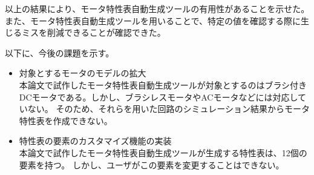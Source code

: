 以上の結果により、モータ特性表自動生成ツールの有用性があることを示せた。また、モータ特性表自動生成ツールを用いることで、特定の値を確認する際に生じるミスを削減できることが確認できた。

以下に、今後の課題を示す。

\begin{itemize}
    \item 対象とするモータのモデルの拡大\\
    本論文で試作したモータ特性表自動生成ツールが対象とするのはブラシ付きDCモータである。しかし、ブラシレスモータやACモータなどには対応していない。
    そのため、それらを用いた回路のシミュレーション結果からモータ特性表を作成できない。

\item 特性表の要素のカスタマイズ機能の実装\\
      本論文で試作したモータ特性表自動生成ツールが生成する特性表は、12個の要素を持つ。
      しかし、ユーザがこの要素を変更することはできない。



\end{itemize}



